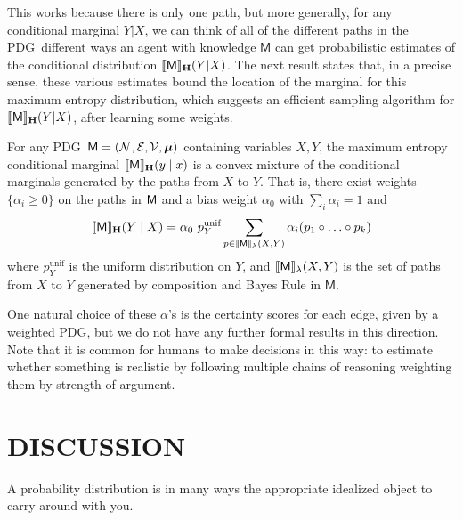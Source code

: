 \documentclass{article}
\newcommand\MaxEnt{_{\mathbf H}}
\newcommand{\sfM}{\mathsf M}
\newcommand{\MN}{PDG}
\numberwithin{equation}{section}
\begin{document}
	This works because there is only one path, but more generally, for any conditional marginal $Y|X$, we can think of all of the different paths in the \MN\ different ways an agent with knowledge $\sfM$ can get probabilistic estimates of the conditional distribution $\bbr{\sfM}\MaxEnt(Y | X)$. The next result states that, in a precise sense, these various estimates bound the location of the marginal for this maximum entropy distribution, which suggests an efficient sampling algorithm for $\bbr{\sfM}\MaxEnt(Y | X)$, after learning some weights.
	
	\begin{conj}\label{thm:maxent-hull}
		For any \MN\ $\sfM = \mnvars[]$ containing variables $X, Y$, the maximum entropy conditional marginal $\bbr{\sfM}\MaxEnt(y \mid x)$ is a convex mixture of the conditional marginals generated by the paths from $X$ to $Y$.  That is, there exist weights $\{\alpha_i \geq 0\}$ on the paths in $\sf M$ and a bias weight $\alpha_0$ with $\sum_i {\alpha_i} = 1$ and
		$$ \bbr{\sfM}\MaxEnt(Y \mid X) = \alpha_0 \  p^{\text{unif}}_Y \sum_{p \in \bbr{\sfM}_\lambda(X, Y)} \alpha_i (p_1 \circ \ldots \circ p_k) $$		
		where $p^{\text{unif}}_Y$ is the uniform distribution on $Y$, and $\bbr{\sfM}_\lambda(X,Y)$ is the set of paths from $X$ to $Y$ generated by composition and Bayes Rule in $\sfM$. 
	\end{conj}

	One natural choice of these $\alpha$'s is the certainty scores for each edge, given by a weighted \MN, but we do not have any further formal results in this direction.
	Note that it is common for humans to make decisions in this way: to estimate whether something is realistic by following multiple chains of reasoning weighting them by strength of argument.
	
	





	\section{DISCUSSION}
	
	
	A probability distribution is in many ways the appropriate idealized object to carry around with you.
	
\end{document}
